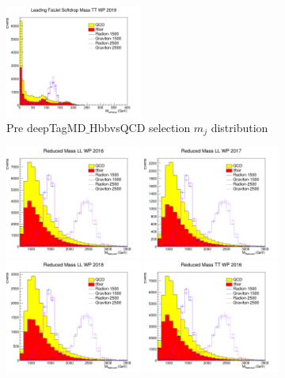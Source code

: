 \begin{figure}[!htb]
	\includegraphics[width=0.4\textwidth]{Figures/msd0TT_18_deepTagMD_HbbvsQCD.png}
	\caption{Pre deepTagMD$\_$HbbvsQCD selection $m_{j}$ distribution}
	\label{fig:premsd0BY}
\end{figure}
\begin{figure}[!htb]
	\centering
	\includegraphics[width=0.4\textwidth]{Figures/mredLL_16_deepTagMD_HbbvsQCD.png}
	\includegraphics[width=0.4\textwidth]{Figures/mredLL_17_deepTagMD_HbbvsQCD.png}
	\includegraphics[width=0.4\textwidth]{Figures/mredLL_18_deepTagMD_HbbvsQCD.png}
	\includegraphics[width=0.4\textwidth]{Figures/mredTT_16_deepTagMD_HbbvsQCD.png}

\end{figure}
